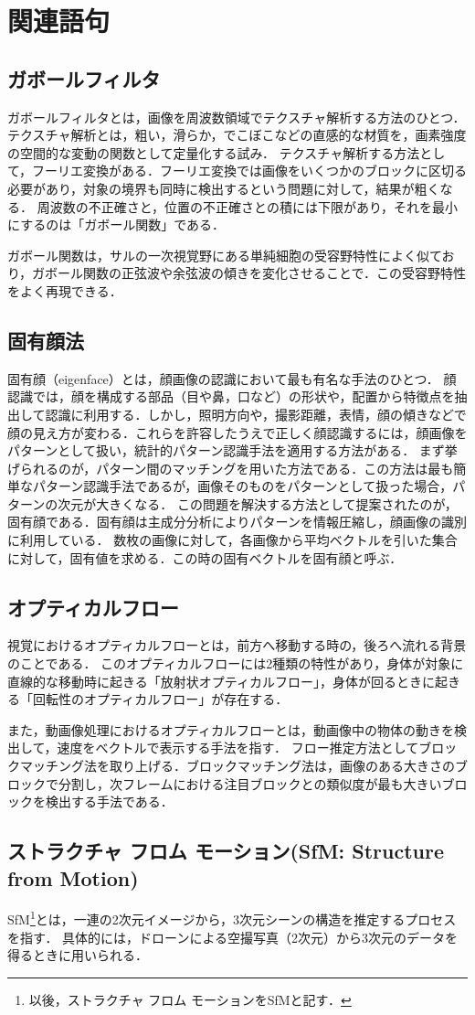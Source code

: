 \chapter{関連語句}
\section{ガボールフィルタ}
ガボールフィルタとは，画像を周波数領域でテクスチャ解析する方法のひとつ．
テクスチャ解析とは，粗い，滑らか，でこぼこなどの直感的な材質を，画素強度の空間的な変動の関数として定量化する試み\cite{テクスチャ解析}．
テクスチャ解析する方法として，フーリエ変換がある．フーリエ変換では画像をいくつかのブロックに区切る必要があり，対象の境界も同時に検出するという問題に対して，結果が粗くなる．
周波数の不正確さと，位置の不正確さとの積には下限があり，それを最小にするのは「ガボール関数」である．\par
ガボール関数は，サルの一次視覚野にある単純細胞の受容野特性によく似ており，ガボール関数の正弦波や余弦波の傾きを変化させることで．この受容野特性をよく再現できる．
\begin{flushright}
    \cite[p.144]{認知心理学辞典}
\end{flushright}
\section{固有顔法}
固有顔（eigenface）とは，顔画像の認識において最も有名な手法のひとつ．
顔認識では，顔を構成する部品（目や鼻，口など）の形状や，配置から特徴点を抽出して認識に利用する．しかし，照明方向や，撮影距離，表情，顔の傾きなどで顔の見え方が変わる．これらを許容したうえで正しく顔認識するには，顔画像をパターンとして扱い，統計的パターン認識手法を適用する方法がある．
まず挙げられるのが，パターン間のマッチングを用いた方法である．この方法は最も簡単なパターン認識手法であるが，画像そのものをパターンとして扱った場合，パターンの次元が大きくなる．
この問題を解決する方法として提案されたのが，固有顔である．固有顔は主成分分析によりパターンを情報圧縮し，顔画像の識別に利用している．
数枚の画像に対して，各画像から平均ベクトルを引いた集合に対して，固有値を求める．この時の固有ベクトルを固有顔と呼ぶ．\par
\hfill\cite{顔画像からの個人識別}
\section{オプティカルフロー}
視覚におけるオプティカルフローとは，前方へ移動する時の，後ろへ流れる背景のことである．
このオプティカルフローには2種類の特性があり，身体が対象に直線的な移動時に起きる「放射状オプティカルフロー」，身体が回るときに起きる「回転性のオプティカルフロー」が存在する\cite[p.679]{人間の運動学}．\par
また，動画像処理におけるオプティカルフローとは，動画像中の物体の動きを検出して，速度をべクトルで表示する手法を指す．
フロー推定方法としてブロックマッチング法を取り上げる．ブロックマッチング法は，画像のある大きさのブロックで分割し，次フレームにおける注目ブロックとの類似度が最も大きいブロックを検出する手法である\cite{オプティカルフローを用いた画像中の野鳥検出}．
\section{ストラクチャ フロム モーション(SfM: Structure from Motion)}
SfM\footnote{以後，ストラクチャ フロム モーションをSfMと記す．}とは，一連の2次元イメージから，3次元シーンの構造を推定するプロセスを指す\cite{SfM}．
具体的には，ドローンによる空撮写真（2次元）から3次元のデータを得るときに用いられる．
